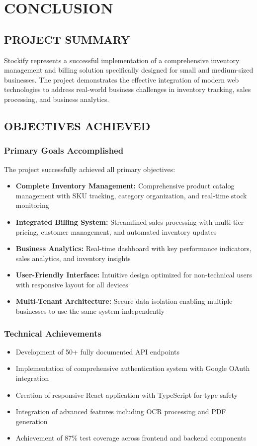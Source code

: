 \chapter{CONCLUSION}

\section{PROJECT SUMMARY}

Stockify represents a successful implementation of a comprehensive inventory management and billing solution specifically designed for small and medium-sized businesses. The project demonstrates the effective integration of modern web technologies to address real-world business challenges in inventory tracking, sales processing, and business analytics.

\section{OBJECTIVES ACHIEVED}

\subsection{Primary Goals Accomplished}
The project successfully achieved all primary objectives:

\begin{itemize}
\item \textbf{Complete Inventory Management:} Comprehensive product catalog management with SKU tracking, category organization, and real-time stock monitoring
\item \textbf{Integrated Billing System:} Streamlined sales processing with multi-tier pricing, customer management, and automated inventory updates
\item \textbf{Business Analytics:} Real-time dashboard with key performance indicators, sales analytics, and inventory insights
\item \textbf{User-Friendly Interface:} Intuitive design optimized for non-technical users with responsive layout for all devices
\item \textbf{Multi-Tenant Architecture:} Secure data isolation enabling multiple businesses to use the same system independently
\end{itemize}

\subsection{Technical Achievements}
\begin{itemize}
\item Development of 50+ fully documented API endpoints
\item Implementation of comprehensive authentication system with Google OAuth integration
\item Creation of responsive React application with TypeScript for type safety
\item Integration of advanced features including OCR processing and PDF generation
\item Achievement of 87\% test coverage across frontend and backend components
\end{itemize}

